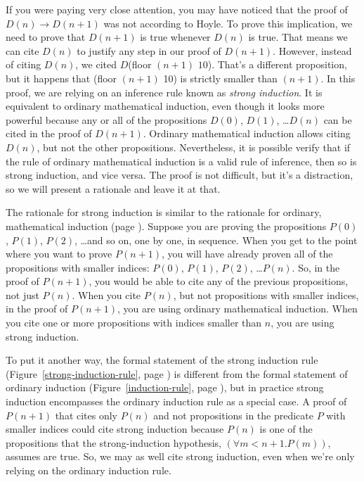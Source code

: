 If you were paying very close attention,
you may have noticed that the proof of $D(n) \rightarrow D(n+1)$
was not according to Hoyle.
To prove this implication, we need to prove that $D(n+1)$ is true whenever $D(n)$ is true.
That means we can cite $D(n)$ to justify any step in our proof of $D(n+1)$.
However, instead of citing $D(n)$, we cited $D$\textsf{(floor $(n+1)$ $10$)}.
That's a different proposition,
but it happens that \textsf{(floor $(n+1)$ 10)} is strictly smaller than $(n+1)$.
In this proof, we are relying on an inference rule
known as \emph{strong induction}.
It is equivalent to ordinary mathematical induction,
even though it looks more powerful because any or all of the
propositions $D(0)$, $D(1)$, \dots $D(n)$ can be cited in the proof of $D(n+1)$.
Ordinary mathematical induction allows citing $D(n)$, but not the other
propositions.
Nevertheless, it is possible verify that if the rule of ordinary mathematical induction
is a valid rule of inference, then so is strong induction, and vice versa.
The proof is not difficult, but it's a distraction,
so we will present a rationale and leave it at that.

\label{strong-induction-rationale}
The rationale for
strong induction is similar to
the rationale for ordinary, mathematical induction (page \pageref{induction-rationale}).
Suppose you are proving the propositions
$P(0)$, $P(1)$, $P(2)$, \dots and so on,
one by one, in sequence.
When you get to the point where you want to prove $P(n+1)$,
you will have already proven all of the propositions
with smaller indices:
$P(0)$, $P(1)$, $P(2)$, \dots $P(n)$.
So, in the proof of $P(n+1)$, you would be able to
cite any of the previous propositions, not just $P(n)$.
When you cite $P(n)$, but not propositions with smaller indices,
in the proof of $P(n+1)$, you are using ordinary mathematical induction.
When you cite one or more propositions with indices smaller than $n$,
you are using strong induction.

To put it another way, the formal statement of the strong induction rule
(Figure~\ref{strong-induction-rule}, page \pageref{strong-induction-rule})
is different from the formal statement of ordinary induction
(Figure~\ref{induction-rule}, page \pageref{induction-rule}), but
in practice strong induction encompasses the ordinary induction rule
as a special case. A proof of $P(n+1)$ that cites only $P(n)$
and not propositions in the predicate $P$ with smaller indices
could cite strong induction because $P(n)$ is one of the propositions
that the strong-induction
hypothesis, $(\forall m<n+1.P(m))$, assumes are true.
So, we may as well cite strong induction, even when we're only relying
on the ordinary induction rule.

